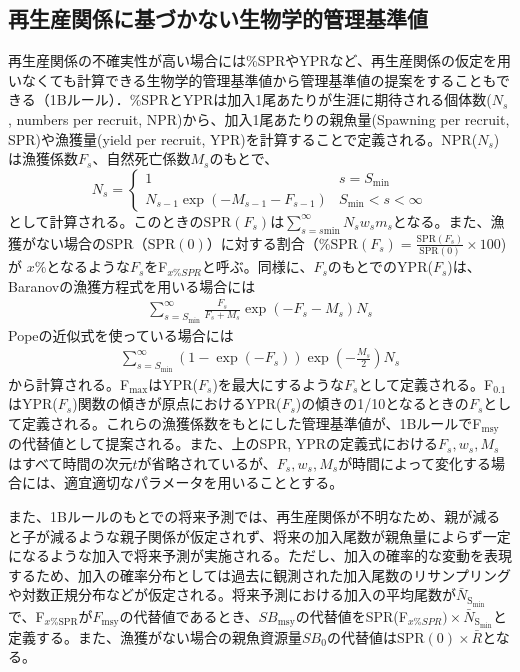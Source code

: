 \documentclass[11pt]{jsarticle}
\begin{document}
\subsection{再生産関係に基づかない生物学的管理基準値\label{1Brule}}

再生産関係の不確実性が高い場合には\%SPRやYPRなど、再生産関係の仮定を用いなくても計算できる生物学的管理基準値から管理基準値の提案をすることもできる（1Bルール）．\%SPRとYPRは加入1尾あたりが生涯に期待される個体数($N_{s}$, numbers per recruit, NPR)から、加入1尾あたりの親魚量(Spawning per recruit, SPR)や漁獲量(yield per recruit, YPR)を計算することで定義される。NPR($N_{s}$)は漁獲係数$F_{s}$、自然死亡係数$M_{s}$のもとで、
\begin{equation}
  N_{s} = \begin{cases}
    1 &     s = S_\mathrm{min} \\    
    N_{s-1}  \exp(-M_{s-1}- F_{s-1} )  &    S_\mathrm{min} < s < \infty
  \end{cases}
  \label{spr}
\end{equation}
として計算される。このときの$\mathrm{SPR}(F_{s})$は$\sum_{s=s\mathrm{min}}^{\infty} N_{s}w_sm_s$となる。また、漁獲がない場合のSPR（$\mathrm{SPR}(0)$）に対する割合（\%$\mathrm{SPR}(F_{s})=\frac{\mathrm{SPR}(F_{s})}{\mathrm{SPR}(0)} \times 100$)が $x$\%となるような$F_s$をF$_{x\%SPR}$と呼ぶ。同様に、$F_{s}$のもとでのYPR($F_{s}$)は、Baranovの漁獲方程式を用いる場合には
\begin{eqnarray}
  \sum_{s=S_{\mathrm{min}}}^{\infty} \frac{F_{s}}{F_{s}+M_{s}} \exp(- F_{s}-M_{s}) N_{s} 
\end{eqnarray}
Popeの近似式を使っている場合には
\begin{eqnarray}
  \sum_{s=S_{\mathrm{min}}}^{\infty} (1-\exp(- F_{s})) \exp(-\frac{M_{s}}{2}) N_{s}
\end{eqnarray}
から計算される。F$_{\mathrm{max}}$はYPR($F_s$)を最大にするような$F_{s}$として定義される。F$_{\mathrm{0.1}}$はYPR($F_s$)関数の傾きが原点におけるYPR($F_s$)の傾きの1/10となるときの$F_s$として定義される。これらの漁獲係数をもとにした管理基準値が、1BルールでF$_{\mathrm{msy}}$の代替値として提案される。また、上のSPR, YPRの定義式における$F_s, w_s, M_s$はすべて時間の次元$t$が省略されているが、$F_s, w_s, M_s$が時間によって変化する場合には、適宜適切なパラメータを用いることとする。

また、1Bルールのもとでの将来予測では、再生産関係が不明なため、親が減ると子が減るような親子関係が仮定されず、将来の加入尾数が親魚量によらず一定になるような加入で将来予測が実施される。ただし、加入の確率的な変動を表現するため、加入の確率分布としては過去に観測された加入尾数のリサンプリングや対数正規分布などが仮定される。将来予測における加入の平均尾数が${\bar N_\mathrm{S_{min}}}$で、F$_{x\%\mathrm{SPR}}$が$F_\mathrm{msy}$の代替値であるとき、$S\!B_{\mathrm{msy}}$の代替値をSPR(F$_{x\%SPR}) \times {\bar N_\mathrm{S_{min}}}$と定義する。また、漁獲がない場合の親魚資源量$S\!B_{0}$の代替値は$\mathrm{SPR}(0) \times \bar{R}$となる。
\end{document}
